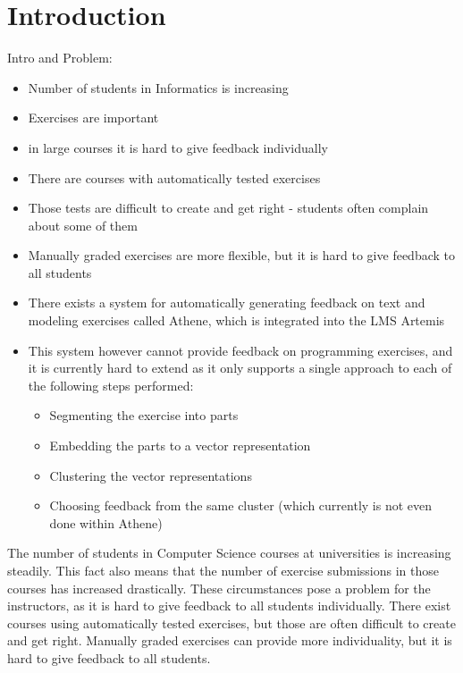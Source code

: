 \section*{Introduction}
Intro and Problem:
\begin{itemize}
        \item Number of students in Informatics is increasing
        \item Exercises are important
        \item in large courses it is hard to give feedback individually
        \item There are courses with automatically tested exercises
        \item Those tests are difficult to create and get right - students often complain about some of them
        \item Manually graded exercises are more flexible, but it is hard to give feedback to all students
        \item There exists a system for automatically generating feedback on text and modeling exercises called Athene, which is integrated into the LMS Artemis
        \item This system however cannot provide feedback on programming exercises, and it is currently hard to extend as it only supports a single approach to each of the following steps performed:
        \begin{itemize}
                \item Segmenting the exercise into parts
                \item Embedding the parts to a vector representation
                \item Clustering the vector representations
                \item Choosing feedback from the same cluster (which currently is not even done within Athene)
        \end{itemize}
\end{itemize}
The number of students in Computer Science courses at universities is increasing steadily. This fact also means that the number of exercise submissions in those courses has increased drastically.
These circumstances pose a problem for the instructors, as it is hard to give feedback to all students individually. There exist courses using automatically tested exercises, but those are often difficult to create and get right. Manually graded exercises can provide more individuality, but it is hard to give feedback to all students.

